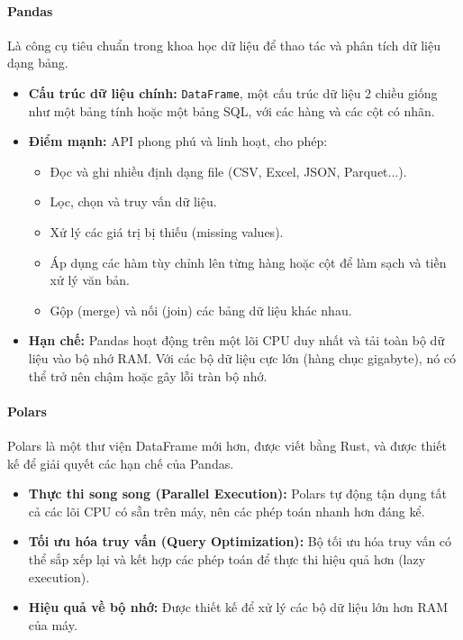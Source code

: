 \paragraph{Pandas}
Là công cụ tiêu chuẩn trong khoa học dữ liệu để thao tác và phân tích dữ liệu dạng bảng.
\begin{itemize}
    \item \textbf{Cấu trúc dữ liệu chính:} \texttt{DataFrame}, một cấu trúc dữ liệu 2 chiều giống như một bảng tính hoặc một bảng SQL, với các hàng và các cột có nhãn.
    \item \textbf{Điểm mạnh:} API phong phú và linh hoạt, cho phép:
        \begin{itemize}
            \item Đọc và ghi nhiều định dạng file (CSV, Excel, JSON, Parquet...).
            \item Lọc, chọn và truy vấn dữ liệu.
            \item Xử lý các giá trị bị thiếu (missing values).
            \item Áp dụng các hàm tùy chỉnh lên từng hàng hoặc cột để làm sạch và tiền xử lý văn bản.
            \item Gộp (merge) và nối (join) các bảng dữ liệu khác nhau.
        \end{itemize}
    \item \textbf{Hạn chế:} Pandas hoạt động trên một lõi CPU duy nhất và tải toàn bộ dữ liệu vào bộ nhớ RAM. Với các bộ dữ liệu cực lớn (hàng chục gigabyte), nó có thể trở nên chậm hoặc gây lỗi tràn bộ nhớ.
\end{itemize}

\paragraph{Polars}
Polars là một thư viện DataFrame mới hơn, được viết bằng Rust, và được thiết kế để giải quyết các hạn chế của Pandas.
\begin{itemize}
    \item \textbf{Thực thi song song (Parallel Execution):} Polars tự động tận dụng tất cả các lõi CPU có sẵn trên máy, nên các phép toán nhanh hơn đáng kể.
    \item \textbf{Tối ưu hóa truy vấn (Query Optimization):} Bộ tối ưu hóa truy vấn có thể sắp xếp lại và kết hợp các phép toán để thực thi hiệu quả hơn (lazy execution).
    \item \textbf{Hiệu quả về bộ nhớ:} Được thiết kế để xử lý các bộ dữ liệu lớn hơn RAM của máy.
\end{itemize}

